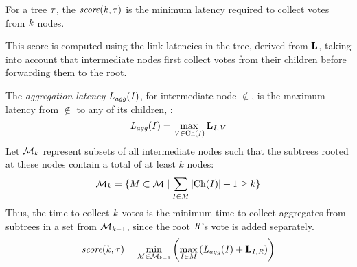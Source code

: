 \begin{definition}\label{def:score}
  For a tree $\tau$, the $\textit{score}(\mathit{k}, \tau)$ is the minimum latency required to collect votes from $\mathit{k}$ nodes.

  This score is computed using the link latencies in the tree, derived from $\mathbf{L}$, taking into account that intermediate nodes first collect votes from their children before forwarding them to the root.

  The \textit{aggregation latency} $\mathit{L_{agg}(\mathit{I})}$, for intermediate node $\nin$, is the maximum latency from $\nin$ to any of its children, \Ch{\nin}:
  \[
    \mathit{L_{agg}(\mathit{I})} = \max_{\mathit{V} \in \textnormal{Ch}(\mathit{I})} \mathbf{L}_{\mathit{I},\mathit{V}}
  \]
  Let $\mathcal{M}_k$ represent subsets of all intermediate nodes such that the subtrees rooted at these nodes contain a total of at least $k$ nodes:
  \[
    \mathcal{M}_k = \{M \subset \mathcal{M} \mid \sum_{\mathit{I} \in M} |\textnormal{Ch}(\mathit{I})| + 1 \geq k \}
  \]
  Thus, the time to collect $\mathit{k}$ votes is the minimum time to collect aggregates from subtrees in a set from $\mathcal{M}_{\mathit{k}-1}$, since the root $\mathit{R}$'s vote is added separately.
  \[
    \textit{score}(\mathit{k}, \tau) = \min_{M \in \mathcal{M}_{\mathit{k}-1}} \left( \max_{\mathit{I} \in M} \left( \mathit{L_{agg}(\mathit{I})} + \mathbf{L}_{\mathit{I},\mathit{R}} \right) \right)
  \]
\end{definition}
